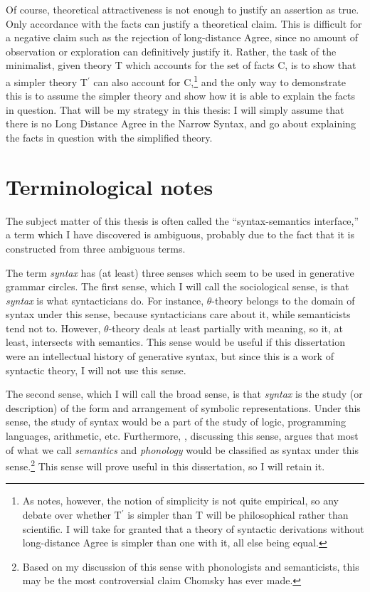\documentclass[MilwayThesis]{subfiles}
\begin{document}
Of course, theoretical attractiveness is not enough to justify an assertion as true.
Only accordance with the facts can justify a theoretical claim.
This is difficult for a negative claim such as the rejection of long-distance Agree, since no amount of observation or exploration can definitively justify it.
Rather, the task of the minimalist, given theory T which accounts for the set of facts C, is to show that a simpler theory T$^\prime$ can also account for C,\footnote{
As \textcite{chomsky1965aspects} notes, however, the notion of simplicity is not quite empirical, so any debate over whether T$^\prime$ is simpler than T will be philosophical rather than scientific.
I will take for granted that a theory of syntactic derivations without long-distance Agree is simpler than one with it, all else being equal.}
 and the only way to demonstrate this is to assume the simpler theory and show how it is able to explain the facts in question.
That will be my strategy in this thesis: I will simply assume that there is no Long Distance Agree in the Narrow Syntax, and go about explaining the facts in question with the simplified theory.
\section{Terminological notes}
The subject matter of this thesis is often called the ``syntax-semantics interface,'' a term which I have discovered is ambiguous, probably due to the fact that it is constructed from three ambiguous terms.

The term \textit{syntax} has (at least) three senses which seem to be used in generative grammar circles.
The first sense, which I will call the sociological sense, is that \textit{syntax} is what syntacticians do.
For instance, $\theta$-theory belongs to the domain of syntax under this sense, because syntacticians care about it, while semanticists tend not to.
However, $\theta$-theory deals at least partially with meaning, so it, at least, intersects with semantics.
This sense would be useful if this dissertation were an intellectual history of generative syntax, but since this is a work of syntactic theory, I will not use this sense.

The second sense, which I will call the broad sense, is that \textit{syntax} is the study (or description) of the form and arrangement of symbolic representations.
Under this sense, the study of syntax would be a part of the study of logic, programming languages, arithmetic, etc.
Furthermore, \textcite[174]{chomsky2000new}, discussing this sense, argues that most of what we call \textit{semantics} and \textit{phonology} would be classified as syntax under this sense.\footnote{Based on my discussion of this sense with phonologists and semanticists, this may be the most controversial claim Chomsky has ever made.}
This sense will prove useful in this dissertation, so I will retain it.
\end{document}
